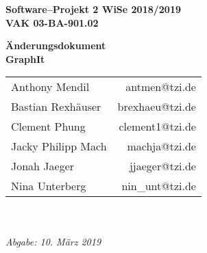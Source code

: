 \documentclass[enabledeprecatedfontcommands,fontsize=11pt,paper=a4,twoside]{scrartcl}
\begin{document}
  \thispagestyle{fancy}
  \fancyhead[LO,RE]{ }
  \fancyfoot[C]{}

  \vspace{3cm}

  \begin{minipage}[H]{\textwidth}
  \begin{center}
  \bf
  \Large
  Software--Projekt 2 WiSe 2018/2019\\
  \smallskip
  \small
  VAK 03-BA-901.02\\
  \vspace{3cm}
  \end{center}
  \end{minipage}
  \begin{minipage}[H]{\textwidth}
  \begin{center}
  \vspace{1cm}
  \bf
  \Large Änderungsdokument \\ 
  \vspace{1cm}
  \Huge\textbf{GraphIt}\normalsize
  \vfill
  \end{center}
  \end{minipage}
  \vfill
  \begin{minipage}[H]{\textwidth}
  \begin{center}
  \sf
  \begin{tabular}{lr}
  Anthony Mendil & antmen@tzi.de \\
  Bastian Rexhäuser & brexhaeu@tzi.de\\
  Clement Phung & clement1@tzi.de \\
  Jacky Philipp Mach & machja@tzi.de \\
  Jonah Jaeger & jjaeger@tzi.de \\
  Nina Unterberg & nin\_unt@tzi.de \\
  \end{tabular}
  \\ ~
  \vspace{2cm}
  \\
  \it Abgabe: 10. März 2019\\ ~
  \end{center}
  \end{minipage}

\thispagestyle{empty}
\cleardoublepage
\newpage
\end{document}
